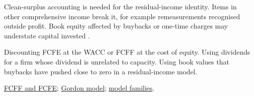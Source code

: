 \begin{qfmethod}
 Clean-surplus accounting is needed for the residual-income identity. Items in other comprehensive income break it, for example remeasurements recognised outside profit. Book equity affected by buybacks or one-time charges may understate capital invested \citep[p.~597]{investment-valuation-2012}.

 Discounting FCFE at the WACC or FCFF at the cost of equity. Using dividends for a firm whose dividend is unrelated to capacity. Using book values that buybacks have pushed close to zero in a residual-income model.

 \hyperref[meth:free-cash-flow-coverage]{FCFF and FCFE}; \hyperref[meth:gordon-growth-model]{Gordon model}; \hyperref[def:valuation-model-families]{model families}.

\end{qfmethod}


